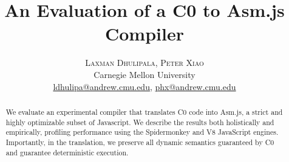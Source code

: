\documentclass[twoside]{article}
\title{\vspace{-15mm}\fontsize{18pt}{10pt}\selectfont\textbf{An Evaluation of a C0 to Asm.js Compiler}} %
\author{
\large
\textsc{Laxman Dhulipala, Peter Xiao}\\[2mm] %
\normalsize Carnegie Mellon University \\ %
\normalsize \href{mailto:ldhulipa@andrew.cmu.edu}{ldhulipa@andrew.cmu.edu}, \href{mailto:phx@andrew.cmu.edu}{phx@andrew.cmu.edu} %
\vspace{-5mm}
}
\date{}
\begin{document}
\maketitle %

\thispagestyle{fancy} %


\begin{abstract}

\noindent We evaluate an experimental compiler that translates C0 code into Asm.js, a strict
and highly optimizable subset of Javascript. We describe the results both holistically and empirically,
profiling performance using the Spidermonkey and V8 JavaScript engines. Importantly, in the
translation, we preserve all dynamic semantics guaranteed by C0 and guarantee deterministic execution.

\end{abstract}

\end{document}
